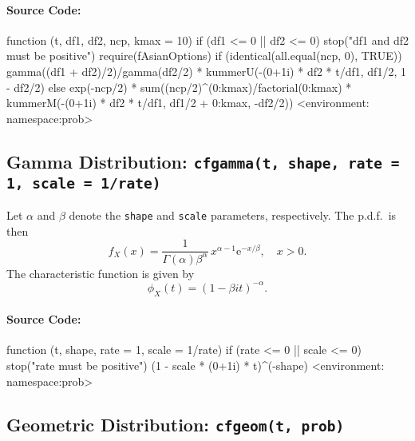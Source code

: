 \documentclass[english]{article}
\newcommand{\me}{\mathrm{e}}
\begin{document}
\paragraph*{Source Code:}

\begin{Schunk}
\begin{Soutput}
function (t, df1, df2, ncp, kmax = 10) 
{
    if (df1 <= 0 || df2 <= 0) 
        stop("df1 and df2 must be positive")
    require(fAsianOptions)
    if (identical(all.equal(ncp, 0), TRUE)) {
        gamma((df1 + df2)/2)/gamma(df2/2) * kummerU(-(0+1i) * 
            df2 * t/df1, df1/2, 1 - df2/2)
    }
    else {
        exp(-ncp/2) * sum((ncp/2)^(0:kmax)/factorial(0:kmax) * 
            kummerM(-(0+1i) * df2 * t/df1, df1/2 + 0:kmax, -df2/2))
    }
}
<environment: namespace:prob>
\end{Soutput}
\end{Schunk}


\subsection{Gamma Distribution: \texttt{cfgamma(t, shape, rate = 1, scale = 1/rate)}\label{sub:Gamma-Distribution}}

Let $\alpha$ and $\beta$ denote the \texttt{shape} and \texttt{scale}
parameters, respectively. The p.d.f.~is then\[
f_{X}(x)=\frac{1}{\Gamma(\alpha)\beta^{\alpha}}\, x^{\alpha-1}\me^{-x/\beta},\quad x>0.\]
The characteristic function is given by\[
\phi_{X}(t)=\left(1-\beta it\right)^{-\alpha}.\]



\paragraph*{Source Code:}

\begin{Schunk}
\begin{Soutput}
function (t, shape, rate = 1, scale = 1/rate) 
{
    if (rate <= 0 || scale <= 0) 
        stop("rate must be positive")
    (1 - scale * (0+1i) * t)^(-shape)
}
<environment: namespace:prob>
\end{Soutput}
\end{Schunk}


\subsection{Geometric Distribution: \texttt{cfgeom(t, prob)}}
\end{document}
